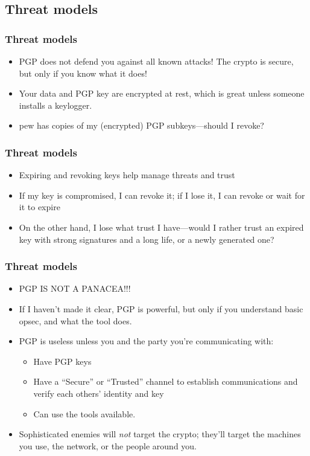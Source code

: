 \documentclass[aspectratio=1610,bigger,utf8]{beamer}
\begin{document}
\subsection{Threat models}
\begin{frame}
	\frametitle{Threat models}
	\begin{itemize}
		\item PGP does not defend you against all known attacks! The
			\alert{crypto is secure}, but only if you know what it
			does!
		\item Your data and PGP key are \alert{encrypted at rest},
			which is great unless someone installs a
			\alert{keylogger}.
		\item \alert{pew} has copies of my (encrypted) PGP
			subkeys---should I revoke?
	\end{itemize}
\end{frame}
\begin{frame}
	\frametitle{Threat models}
	\begin{itemize}
		\item Expiring and revoking keys help manage threats and trust
		\item If my key is compromised, I can revoke it; if I lose it,
			I can revoke or wait for it to expire
		\item On the other hand, I lose what trust I have---would I
			rather trust an expired key with strong signatures and
			a long life, or a newly generated one?
	\end{itemize}
\end{frame}
\begin{frame}
	\frametitle{Threat models}
	\begin{itemize}
		\item \alert{PGP IS NOT A PANACEA!!!}
		\item If I haven't made it clear, PGP is powerful, but only if
			you understand basic opsec, and what the tool does.
		\item PGP is useless unless you and the party you're communicating with:
			\begin{itemize}
				\item Have PGP keys
				\item Have a ``Secure'' or ``Trusted'' channel
					to establish communications and verify
					each others' identity and key
				\item Can use the tools available.
			\end{itemize}
		\item Sophisticated enemies will \emph{not} target the crypto;
			they'll target the machines you use, the network, or
			the people around you.
	\end{itemize}
\end{frame}
\end{document}
